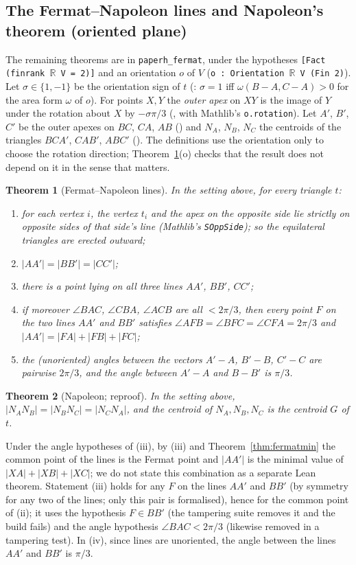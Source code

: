 \documentclass[11pt]{article}
\newtheorem{theorem}{Theorem}
\theoremstyle{definition}
\theoremstyle{remark}
\newcommand{\lean}[1]{\texttt{#1}}
\begin{document}
\subsection{The Fermat--Napoleon lines and Napoleon's theorem (oriented plane)}
The remaining theorems are in \lean{paperh\_fermat}, under the hypotheses
\lean{[Fact (finrank \(\mathbb{R}\) V = 2)]} and an orientation $o$ of $V$
(\lean{o : Orientation \(\mathbb{R}\) V (Fin 2)}). Let $\sigma\in\{1,-1\}$ be the orientation sign of
$t$ (: $\sigma=1$ iff $\omega(B-A,C-A)>0$ for the area form $\omega$
of $o$). For points $X,Y$ the \emph{outer apex} on $XY$ is the image of $Y$ under the rotation about
$X$ by $-\sigma\pi/3$ (, with Mathlib's \lean{o.rotation}). Let $A'$,
$B'$, $C'$ be the outer apexes on $BC$, $CA$, $AB$ () and $N_A$,
$N_B$, $N_C$ the centroids of the triangles $BCA'$, $CAB'$, $ABC'$
(). The definitions use the orientation only to choose the
rotation direction; Theorem~\ref{thm:fn}(o) checks that the result does not depend on it in the
sense that matters.

\begin{theorem}[Fermat--Napoleon lines]\label{thm:fn}
In the setting above, for every triangle $t$:
\begin{enumerate}
\item[(o)] for each vertex $i$, the vertex $t_i$ and the apex on the opposite side lie strictly on
opposite sides of that side's line (Mathlib's \lean{SOppSide}); so the equilateral triangles are
erected outward;
\item[(i)] $|AA'|=|BB'|=|CC'|$;
\item[(ii)] there is a point lying on all three lines $AA'$, $BB'$, $CC'$;
\item[(iii)] if moreover $\angle BAC$, $\angle CBA$, $\angle ACB$ are all $<2\pi/3$, then every point
$F$ on the two lines $AA'$ and $BB'$ satisfies $\angle AFB=\angle BFC=\angle CFA=2\pi/3$ and
$|AA'|=|FA|+|FB|+|FC|$;
\item[(iv)] the (unoriented) angles between the vectors $A'-A$, $B'-B$, $C'-C$ are pairwise
$2\pi/3$, and the angle between $A'-A$ and $B-B'$ is $\pi/3$.
\end{enumerate}
\end{theorem}
\begin{theorem}[Napoleon; reproof]\label{thm:napoleon}
In the setting above, $|N_AN_B|=|N_BN_C|=|N_CN_A|$, and the centroid of $N_A,N_B,N_C$ is the
centroid $G$ of $t$.
\end{theorem}
Under the angle hypotheses of (iii), by (iii) and Theorem~\ref{thm:fermatmin} the common point of the lines is the Fermat point and
$|AA'|$ is the minimal value of $|XA|+|XB|+|XC|$; we do not state this combination as a separate
Lean theorem. Statement (iii) holds for any $F$ on the lines $AA'$ and $BB'$ (by symmetry for any two of the lines;
only this pair is formalised), hence for the common point of (ii); it uses the hypothesis $F\in BB'$ (the tampering suite removes it and the build fails) and
the angle hypothesis $\angle BAC<2\pi/3$ (likewise removed in a tampering test). In (iv), since lines
are unoriented, the angle between the lines $AA'$ and $BB'$ is $\pi/3$.
\end{document}
